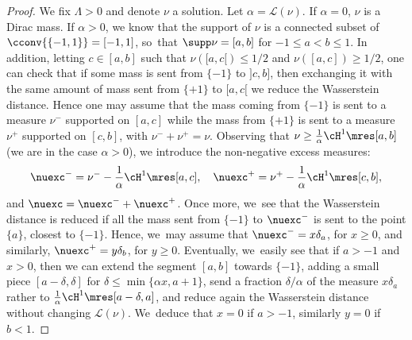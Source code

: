 \begin{proof}
We fix $\Lambda>0$ and denote $\nu$ a solution.
Let $\alpha=\mathcal{L}(\nu)$.
If $\alpha=0$, $\nu$ is a Dirac mass. If $\alpha>0$,
we know that the support of $\nu$ is a connected subset of
$\cconv{\{-1,1\}}=[-1,1]$, so~that $\supp\nu = [a,b]$ for $-1\le a < b\le 1$.
In addition, letting $c\in [a,b]$ such that
$\nu([a,c[)\le 1/2$ and $\nu([a,c])\ge 1/2$, one can check that
if some mass is sent from $\{-1\}$ to $]c,b]$, then exchanging it
with the same amount of mass sent from $\{+1\}$ to $[a,c[$ we reduce
the Wasserstein distance. Hence one may assume that the mass
coming from $\{-1\}$ is sent to a measure $\nu^-$ supported on $[a,c]$
while the mass from $\{+1\}$ is sent to a measure $\nu^+$ supported
on $[c,b]$, with $\nu^-+\nu^+=\nu$. Observing that $\nu\ge \frac{1}{\alpha}\cH^1\mres [a,b]$
(we are in the case $\alpha>0$),
we introduce the non-negative excess measures:
\[
\nuexc^- = \nu^- - \frac{1}{\alpha}\cH^1\mres [a,c],\quad
\nuexc^+ = \nu^+ - \frac{1}{\alpha}\cH^1\mres [c,b],
\]
and $\nuexc = \nuexc^-+\nuexc^+$. Once more, we~see that the Wasserstein
distance is reduced if all the mass sent from $\{-1\}$ to $\nuexc^-$
is sent to the point $\{a\}$, closest to $\{-1\}$. Hence, we~may assume
that $\nuexc^-= x\delta_a$, for $x\ge 0$, and similarly,
$\nuexc^+ = y\delta_b$, for $y\ge 0$. Eventually, we~easily see that
if $a>-1$ and $x>0$, then we can extend the segment $[a,b]$ towards $\{-1\}$,
adding a small piece $[a-\delta,\delta]$ for $\delta\le
\min \{\alpha x, a+1\}$, send a fraction $\delta/\alpha$ of
the measure $x\delta_{a}$ rather to $\frac{1}{\alpha}\cH^1\mres [a-\delta,a]$,
and reduce again the Wasserstein distance without changing $\mathcal{L}(\nu)$. We~deduce that $x=0$ if $a>-1$, similarly $y=0$ if $b<1$.

\newcommand{\noop}[1]{}
\noop{
Since the solutions are supported on a line segment in $\ci{-1}{1}$, they are of the form $\nu=\delta_{a}$ or
$ \nu = \frac{1}{\alpha}\cH^1\mres\ci{a}{b}+\nuexc$,
with $\alpha=\cL(\nu)$ and $\supp \nuexc \subset \ci{a}{b}\subset \ci{-1}{1}$.

Since solutions are supported on a line segment in $\ci{-1}{1}$, we~use the ansatz and assume them to be of the form
\[
\nu = \frac{1}{\alpha}\cH^1\mres\ci{a}{b}
\text{ or }
\nu = \frac{1}{\alpha}\cH^1\mres\ci{-1}{1} + c\delta_{-1} +d\delta_1.
\]
Indeed if the $[a,b]$ does not coincide with $[-1,1]$ and there is any mass left after we form the uniform measure over the segment $[a,b]$, we~enlarge a bit the segment. If $a$ or $b$ coincide with $-1,1$, we~can just leave any residual mass concentrated at the Dirac delta with no transportation cost, see for instance Lemma~\ref{lemma.minimal_distance2Sigma} below.}


\end{proof}
